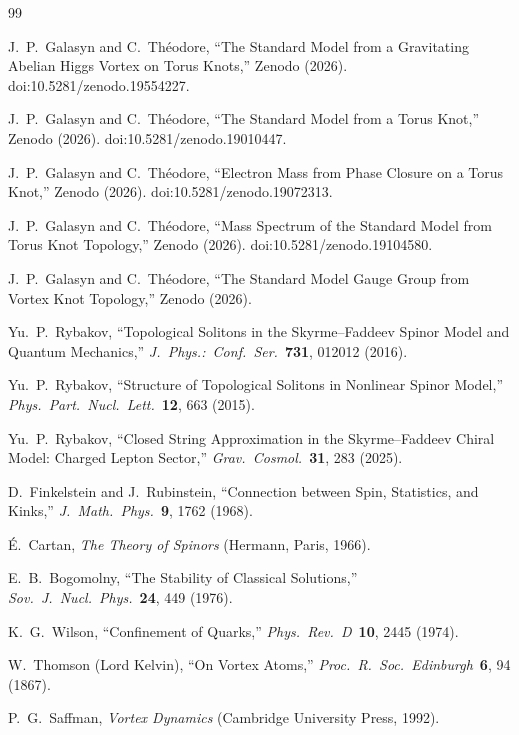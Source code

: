 \documentclass[11pt]{article}
\begin{document}
\begin{thebibliography}{99}

J.~P.~Galasyn and C.~Th\'eodore,
``The Standard Model from a Gravitating Abelian Higgs Vortex on Torus
Knots,''
Zenodo (2026). doi:10.5281/zenodo.19554227.

J.~P.~Galasyn and C.~Th\'eodore,
``The Standard Model from a Torus Knot,''
Zenodo (2026). doi:10.5281/zenodo.19010447.

J.~P.~Galasyn and C.~Th\'eodore,
``Electron Mass from Phase Closure on a Torus Knot,''
Zenodo (2026). doi:10.5281/zenodo.19072313.

J.~P.~Galasyn and C.~Th\'eodore,
``Mass Spectrum of the Standard Model from Torus Knot Topology,''
Zenodo (2026). doi:10.5281/zenodo.19104580.

J.~P.~Galasyn and C.~Th\'eodore,
``The Standard Model Gauge Group from Vortex Knot Topology,''
Zenodo (2026).

Yu.~P.~Rybakov,
``Topological Solitons in the Skyrme--Faddeev Spinor Model and
Quantum Mechanics,''
\emph{J.\ Phys.:\ Conf.\ Ser.}\ \textbf{731}, 012012 (2016).

Yu.~P.~Rybakov,
``Structure of Topological Solitons in Nonlinear Spinor Model,''
\emph{Phys.\ Part.\ Nucl.\ Lett.}\ \textbf{12}, 663 (2015).

Yu.~P.~Rybakov,
``Closed String Approximation in the Skyrme--Faddeev Chiral Model:
Charged Lepton Sector,''
\emph{Grav.\ Cosmol.}\ \textbf{31}, 283 (2025).

D.~Finkelstein and J.~Rubinstein,
``Connection between Spin, Statistics, and Kinks,''
\emph{J.\ Math.\ Phys.}\ \textbf{9}, 1762 (1968).

\'E.~Cartan,
\emph{The Theory of Spinors} (Hermann, Paris, 1966).

E.~B.~Bogomolny,
``The Stability of Classical Solutions,''
\emph{Sov.\ J.\ Nucl.\ Phys.}\ \textbf{24}, 449 (1976).

K.~G.~Wilson,
``Confinement of Quarks,''
\emph{Phys.\ Rev.\ D}\ \textbf{10}, 2445 (1974).

W.~Thomson (Lord Kelvin),
``On Vortex Atoms,''
\emph{Proc.\ R.\ Soc.\ Edinburgh}\ \textbf{6}, 94 (1867).

P.~G.~Saffman,
\emph{Vortex Dynamics} (Cambridge University Press, 1992).

\end{thebibliography}
\end{document}
